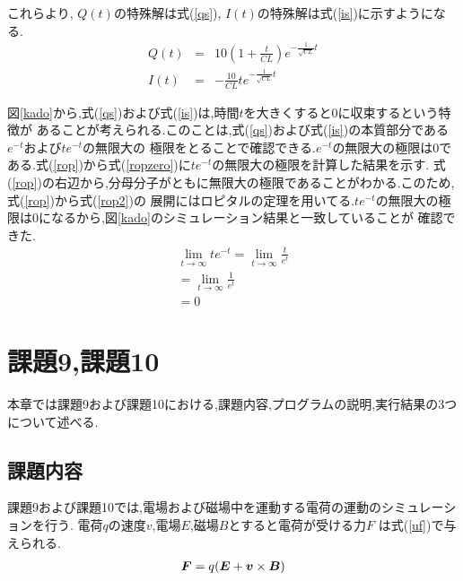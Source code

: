 \documentclass[a4j]{jarticle}
\begin{document}
        これらより, $Q(t)$の特殊解は式(\ref{qs}), $I(t)$の特殊解は式(\ref{is})に示すようになる.
        \begin{eqnarray}
          Q(t) &=& 10(1+\frac{t}{CL})e^{-\frac{1}{\sqrt{CL}}t} \label{qs} \\
          I(t) &=& -\frac{10}{CL}t e^{-\frac{1}{\sqrt{CL}}t} \label{is} 
        \end{eqnarray}        

        図\ref{kado}から,式(\ref{qs})および式(\ref{is})は,時間$t$を大きくすると0に収束するという特徴が
        あることが考えられる.このことは,式(\ref{qs})および式(\ref{is})の本質部分である$e^{-t}$および$te^{-t}$の無限大の
        極限をとることで確認できる.$e^{-t}$の無限大の極限は0である.式(\ref{rop})から式(\ref{ropzero})に$te^{-t}$の無限大の極限を計算した結果を示す.
        式(\ref{rop})の右辺から,分母分子がともに無限大の極限であることがわかる.このため,式(\ref{rop})から式(\ref{rop2})の
        展開にはロピタルの定理を用いてる.$te^{-t}$の無限大の極限は0になるから,図\ref{kado}のシミュレーション結果と一致していることが
        確認できた.
        \begin{eqnarray}
          \lim_{t \to \infty} te^{-t} = \lim_{t \to \infty} \frac{t}{e^t} \label{rop} \\
                                      = \lim_{t \to \infty} \frac{1}{e^t} \label{rop2} \\
                                      = 0　\label{ropzero}
        \end{eqnarray}  

        \section{課題9,課題10}
      本章では課題9および課題10における,課題内容,プログラムの説明,実行結果の3つについて述べる.
      \subsection{課題内容}
      課題9および課題10では,電場および磁場中を運動する電荷の運動のシミュレーションを行う.
      電荷$q$の速度\mbox{\boldmath $v$},電場\mbox{\boldmath $E$},磁場\mbox{\boldmath $B$}とすると電荷が受ける力\mbox{\boldmath $F$}
      は式(\ref{uf})で与えられる.
      \begin{eqnarray}
        \mbox{\boldmath $F$} = q(\mbox{\boldmath $E$}+\mbox{\boldmath $v$} \times \mbox{\boldmath $B$}) \label{uf}
      \end{eqnarray}
\end{document}
